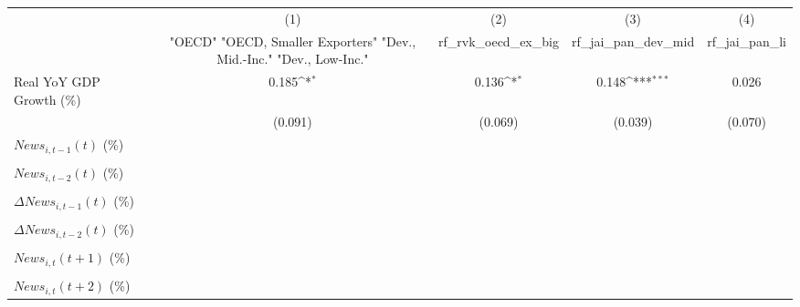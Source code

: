 {
\def\sym#1{\ifmmode^{#1}\else\(^{#1}\)\fi}
\begin{tabular}{l*{4}{c}}
\toprule
                    &\multicolumn{1}{c}{(1)}&\multicolumn{1}{c}{(2)}&\multicolumn{1}{c}{(3)}&\multicolumn{1}{c}{(4)}\\
                    &\multicolumn{1}{c}{ "OECD" "OECD, Smaller Exporters" "Dev., Mid.-Inc." "Dev., Low-Inc."}&\multicolumn{1}{c}{rf_rvk_oecd_ex_big}&\multicolumn{1}{c}{rf_jai_pan_dev_mid}&\multicolumn{1}{c}{rf_jai_pan_li}\\
\midrule
Real YoY GDP Growth (\%)&       0.185\sym{*}  &       0.136\sym{*}  &       0.148\sym{***}&       0.026         \\
                    &     (0.091)         &     (0.069)         &     (0.039)         &     (0.070)         \\
\addlinespace
$ News_{i,t-1}(t)$ (\%)&                     &                     &                     &                     \\
                    &                     &                     &                     &                     \\
\addlinespace
$ News_{i,t-2}(t)$ (\%)&                     &                     &                     &                     \\
                    &                     &                     &                     &                     \\
\addlinespace
$ \Delta News_{i,t-1}(t)$ (\%)&                     &                     &                     &                     \\
                    &                     &                     &                     &                     \\
\addlinespace
$ \Delta News_{i,t-2}(t)$ (\%)&                     &                     &                     &                     \\
                    &                     &                     &                     &                     \\
\addlinespace
$ News_{i,t}(t+1)$ (\%)&                     &                     &                     &                     \\
                    &                     &                     &                     &                     \\
\addlinespace
$ News_{i,t}(t+2)$ (\%)&                     &                     &                     &                     \\

\end{tabular}}
